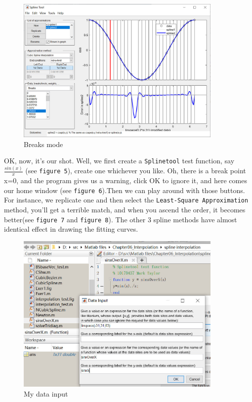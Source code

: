 \documentclass{article}
\begin{document}
\begin{figure}
\centering
\includegraphics[width=10cm]{img/breaks_mode.jpg}
\caption{Breaks mode}
\end{figure}

OK, now, it's our shot. Well, we first create a \texttt{Splinetool} test function, say $\frac{sin(x)}{x}$ (see \texttt{figure 5}),
create one whichever you like. Oh, there is a break point x=0, and the program gives us a warning, click OK to ignore it,
and here comes our home window (see \texttt{figure 6}).Then we can play around with those buttons.
For instance, we replicate one and then select the \texttt{Least-Square Approximation} method, you'll get a terrible match,
and when you ascend the order, it becomes better(see \texttt{figure 7} and \texttt{figure 8}).
The other 3 spline methods have almost identical effect in drawing the fitting curves.

\begin{figure}
\centering
\includegraphics[width=10cm]{img/my_shot_input.jpg}
\caption{My data input}
\end{figure}
\end{document}
